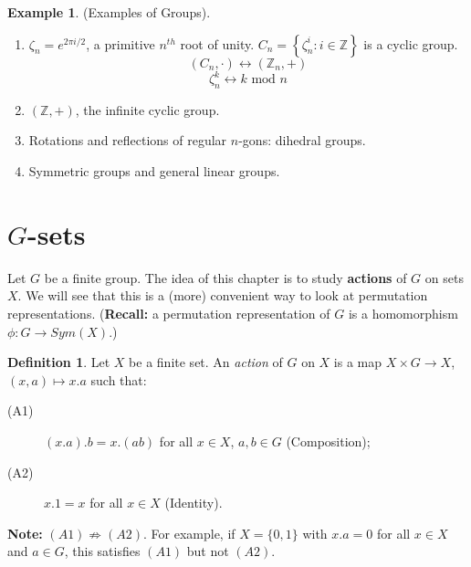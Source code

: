 \documentclass[12pt]{amsart}
\theoremstyle{definition}
\newtheorem{example}[theorem]{Example}
\newtheorem{definition}[theorem]{Definition}
\begin{document}
\begin{example}(Examples of Groups).
\begin{enumerate}
\item $\zeta_{n} = e^{2 \pi i / 2}$, a primitive $n^{th}$ root of unity.
$C_{n} = \left\{ \zeta_{n}^{i} : i \in \mathbb{Z} \right\}$ is a cyclic group.
$$\left( C_{n}, \cdot \right) \longleftrightarrow \left( \mathbb{Z}_{n}, + \right)$$
$$\zeta_{n}^{k} \longleftrightarrow k \text{ mod } n$$
\item$\left( \mathbb{Z}, + \right)$, the infinite cyclic group.
\item Rotations and reflections of regular $n$-gons: dihedral groups.
\item Symmetric groups and general linear groups.
\end{enumerate}
\end{example}

\section{$G$-sets}
\label{sec:G-sets}
Let $G$ be a finite group.  The idea of this chapter is to study \textbf{actions} of $G$ on sets $X$.  We will see that this is a (more) convenient way to look at permutation representations.  (\textbf{Recall:} a permutation representation of $G$ is a homomorphism $\phi:G\rightarrow Sym(X)$.)

\begin{definition}
Let $X$ be a finite set.  An \emph{action} of $G$ on $X$ is a map $X\times G\rightarrow X$, $(x, a)\mapsto x.a$ such that:
\begin{description}
\item[(A1)] $(x.a).b=x.(ab)$ for all $x\in X$, $a, b\in G$ (Composition);
\item[(A2)] $x.1=x$ for all $x\in X$ (Identity).
\end{description}
\end{definition}

\textbf{Note:} $(A1)\nRightarrow(A2).$  For example, if $X=\{0, 1\}$ with $x.a=0$ for all $x\in X$ and $a\in G$, this satisfies $(A1)$ but not $(A2)$.
\end{document}
